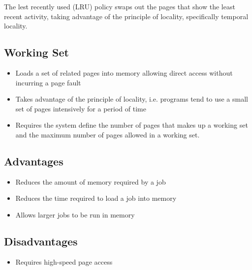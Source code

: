 \documentclass[12pt letter]{report}
\begin{document}

The lest recently used (LRU) policy swaps out the pages that show the least recent activity, taking advantage of the principle of locality, specifically temporal locality.



\subsection{Working Set}

\begin{itemize}
  \item Loads a set of related pages into memory allowing direct access without incurring a page fault
  \item Takes advantage of the principle of locality, i.e. programs tend to use a small set of pages intensively for a period of time
  \item Requires the system define the number of pages that makes up a working set and the maximum number of pages allowed in a working set.
\end{itemize}

\subsection{Advantages}
\begin{itemize}
  \item Reduces the amount of memory required by a job
  \item Reduces the time required to load a job into memory
  \item Allows larger jobs to be run in memory
\end{itemize}

\subsection{Disadvantages}
\begin{itemize}
  \item Requires high-speed page access
\end{itemize}
\end{document}
